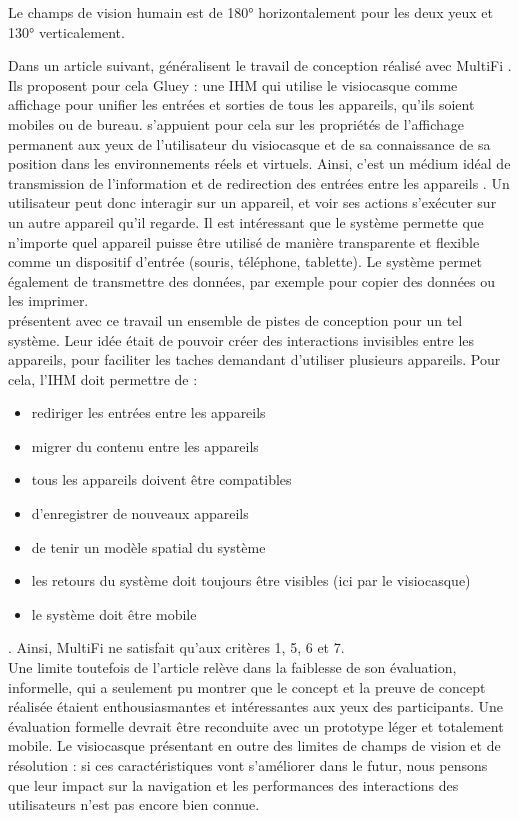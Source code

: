 Le champs de vision humain est de \ang{180} horizontalement pour les deux yeux et \ang{130} verticalement.


Dans un article suivant, \cite{Serrano2015} généralisent le travail de conception réalisé avec MultiFi \citep{Grubert2015}. Ils proposent pour cela Gluey : une IHM qui utilise le visiocasque comme affichage pour unifier les entrées et sorties de tous les appareils, qu'ils soient mobiles ou de bureau. \citeauthor{Serrano2015} s'appuient pour cela sur les propriétés de l'affichage permanent aux yeux de l'utilisateur du visiocasque et de sa connaissance de sa position dans les environnements réels et virtuels. Ainsi, c'est un médium idéal de transmission de l'information et de redirection des entrées entre les appareils .
Un utilisateur peut donc interagir sur un appareil, et voir ses actions s'exécuter sur un autre appareil qu'il regarde. Il est intéressant que le système permette que n'importe quel appareil puisse être utilisé de manière transparente et flexible comme un dispositif d'entrée (souris, téléphone, tablette). Le système permet également de transmettre des données, par exemple pour copier des données ou les imprimer.\\
\citeauthor{Serrano2015} présentent avec ce travail un ensemble de pistes de conception pour un tel système. Leur idée était de pouvoir créer des interactions invisibles entre les appareils, pour faciliter les taches demandant d'utiliser plusieurs appareils. Pour cela, l'IHM doit permettre de : 
\begin{itemize}
  \item rediriger les entrées entre les appareils
  \item migrer du contenu entre les appareils
  \item tous les appareils doivent être compatibles
  \item d'enregistrer de nouveaux appareils
  \item de tenir un modèle spatial du système
  \item les retours du système doit toujours être visibles (ici par le visiocasque)
  \item le système doit être mobile
\end{itemize}. Ainsi, MultiFi \citep{Grubert2015} ne satisfait qu'aux critères 1, 5, 6 et 7.\\
Une limite toutefois de l'article relève dans la faiblesse de son évaluation, informelle, qui a seulement pu montrer que le concept et la preuve de concept réalisée étaient enthousiasmantes et intéressantes aux yeux des participants. Une évaluation formelle devrait être reconduite avec un prototype léger et totalement mobile. Le visiocasque présentant en outre des limites de champs de vision et de résolution : si ces caractéristiques vont s'améliorer dans le futur, nous pensons que leur impact sur la navigation et les performances des interactions des utilisateurs n'est pas encore bien connue.


